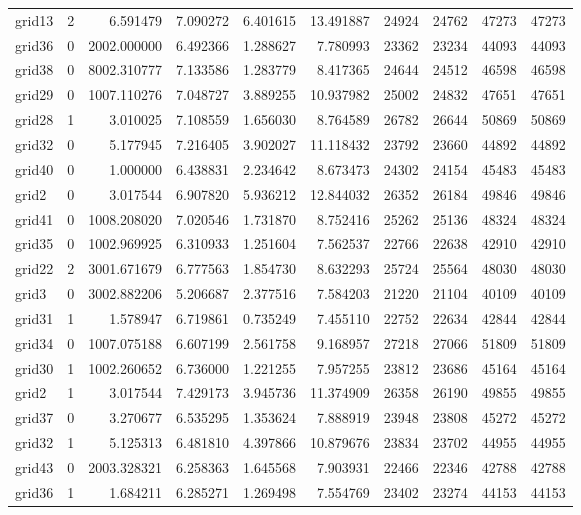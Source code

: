 \begin{longtable}{|l|r|r|r|r|r|r|r|r|r|}
grid13 & 2 & 6.591479 & 7.090272 & 6.401615 & 13.491887 & 24924 & 24762 & 47273 & 47273 \\
grid36 & 0 & 2002.000000 & 6.492366 & 1.288627 & 7.780993 & 23362 & 23234 & 44093 & 44093 \\
grid38 & 0 & 8002.310777 & 7.133586 & 1.283779 & 8.417365 & 24644 & 24512 & 46598 & 46598 \\
grid29 & 0 & 1007.110276 & 7.048727 & 3.889255 & 10.937982 & 25002 & 24832 & 47651 & 47651 \\
grid28 & 1 & 3.010025 & 7.108559 & 1.656030 & 8.764589 & 26782 & 26644 & 50869 & 50869 \\
grid32 & 0 & 5.177945 & 7.216405 & 3.902027 & 11.118432 & 23792 & 23660 & 44892 & 44892 \\
grid40 & 0 & 1.000000 & 6.438831 & 2.234642 & 8.673473 & 24302 & 24154 & 45483 & 45483 \\
grid2 & 0 & 3.017544 & 6.907820 & 5.936212 & 12.844032 & 26352 & 26184 & 49846 & 49846 \\
grid41 & 0 & 1008.208020 & 7.020546 & 1.731870 & 8.752416 & 25262 & 25136 & 48324 & 48324 \\
grid35 & 0 & 1002.969925 & 6.310933 & 1.251604 & 7.562537 & 22766 & 22638 & 42910 & 42910 \\
grid22 & 2 & 3001.671679 & 6.777563 & 1.854730 & 8.632293 & 25724 & 25564 & 48030 & 48030 \\
grid3 & 0 & 3002.882206 & 5.206687 & 2.377516 & 7.584203 & 21220 & 21104 & 40109 & 40109 \\
grid31 & 1 & 1.578947 & 6.719861 & 0.735249 & 7.455110 & 22752 & 22634 & 42844 & 42844 \\
grid34 & 0 & 1007.075188 & 6.607199 & 2.561758 & 9.168957 & 27218 & 27066 & 51809 & 51809 \\
grid30 & 1 & 1002.260652 & 6.736000 & 1.221255 & 7.957255 & 23812 & 23686 & 45164 & 45164 \\
grid2 & 1 & 3.017544 & 7.429173 & 3.945736 & 11.374909 & 26358 & 26190 & 49855 & 49855 \\
grid37 & 0 & 3.270677 & 6.535295 & 1.353624 & 7.888919 & 23948 & 23808 & 45272 & 45272 \\
grid32 & 1 & 5.125313 & 6.481810 & 4.397866 & 10.879676 & 23834 & 23702 & 44955 & 44955 \\
grid43 & 0 & 2003.328321 & 6.258363 & 1.645568 & 7.903931 & 22466 & 22346 & 42788 & 42788 \\
grid36 & 1 & 1.684211 & 6.285271 & 1.269498 & 7.554769 & 23402 & 23274 & 44153 & 44153 \\

\end{longtable}
